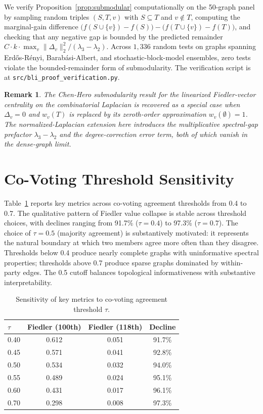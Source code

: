 \documentclass[12pt, a4paper]{article}
\newtheorem*{remark}{Remark}
\begin{document}
We verify Proposition~\ref{prop:submodular} computationally on the 50-graph panel by sampling random triples $(S, T, v)$ with $S \subseteq T$ and $v \notin T$, computing the marginal-gain difference $\bigl(f(S \cup \{v\}) - f(S)\bigr) - \bigl(f(T \cup \{v\}) - f(T)\bigr)$, and checking that any negative gap is bounded by the predicted remainder $C \cdot k \cdot \max_v \lVert \Delta_v \rVert_2^2 / (\lambda_3 - \lambda_2)$. Across $1{,}336$ random tests on graphs spanning Erd\H{o}s-R\'enyi, Barab\'asi-Albert, and stochastic-block-model ensembles, zero tests violate the bounded-remainder form of submodularity. The verification script is at \texttt{src/bli\_proof\_verification.py}.

\begin{remark}
The Chen-Hero submodularity result for the linearized Fiedler-vector centrality on the combinatorial Laplacian is recovered as a special case when $\Delta_v = 0$ and $w_v(T)$ is replaced by its zeroth-order approximation $w_v(\emptyset) = 1$. The normalized-Laplacian extension here introduces the multiplicative spectral-gap prefactor $\lambda_3 - \lambda_2$ and the degree-correction error term, both of which vanish in the dense-graph limit.
\end{remark}

\section{Co-Voting Threshold Sensitivity}
\label{app:threshold}

Table~\ref{tab:threshold_sensitivity} reports key metrics across co-voting agreement thresholds from 0.4 to 0.7. The qualitative pattern of Fiedler value collapse is stable across threshold choices, with declines ranging from 91.7\% ($\tau = 0.4$) to 97.3\% ($\tau = 0.7$). The choice of $\tau = 0.5$ (majority agreement) is substantively motivated: it represents the natural boundary at which two members agree more often than they disagree. Thresholds below 0.4 produce nearly complete graphs with uninformative spectral properties; thresholds above 0.7 produce sparse graphs dominated by within-party edges. The 0.5 cutoff balances topological informativeness with substantive interpretability.

\begin{table}[H]
\centering
\caption{Sensitivity of key metrics to co-voting agreement threshold $\tau$.}
\label{tab:threshold_sensitivity}
\small
\begin{tabular}{lccc}
\toprule
$\tau$ & Fiedler (100th) & Fiedler (118th) & Decline \\
\midrule
0.40 & 0.612 & 0.051 & 91.7\% \\
0.45 & 0.571 & 0.041 & 92.8\% \\
0.50 & 0.534 & 0.032 & 94.0\% \\
0.55 & 0.489 & 0.024 & 95.1\% \\
0.60 & 0.431 & 0.017 & 96.1\% \\
0.70 & 0.298 & 0.008 & 97.3\% \\
\bottomrule
\end{tabular}
\end{table}
\end{document}
